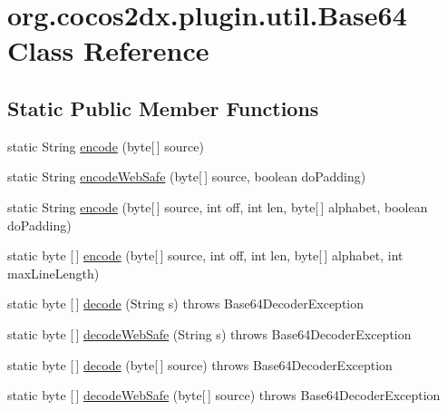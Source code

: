 \hypertarget{classorg_1_1cocos2dx_1_1plugin_1_1util_1_1Base64}{}\section{org.\+cocos2dx.\+plugin.\+util.\+Base64 Class Reference}
\label{classorg_1_1cocos2dx_1_1plugin_1_1util_1_1Base64}
\subsection*{Static Public Member Functions}
\begin{DoxyCompactItemize}
\item 
static String \hyperlink{classorg_1_1cocos2dx_1_1plugin_1_1util_1_1Base64_a4d965b06e97270e1f3989e73bdad171e}{encode} (byte\mbox{[}$\,$\mbox{]} source)
\item 
static String \hyperlink{classorg_1_1cocos2dx_1_1plugin_1_1util_1_1Base64_a4726c7d8d38436e17b5c49ec5d028132}{encode\+Web\+Safe} (byte\mbox{[}$\,$\mbox{]} source, boolean do\+Padding)
\item 
static String \hyperlink{classorg_1_1cocos2dx_1_1plugin_1_1util_1_1Base64_a70461ddf22199c83aeca320cec399187}{encode} (byte\mbox{[}$\,$\mbox{]} source, int off, int len, byte\mbox{[}$\,$\mbox{]} alphabet, boolean do\+Padding)
\item 
static byte \mbox{[}$\,$\mbox{]} \hyperlink{classorg_1_1cocos2dx_1_1plugin_1_1util_1_1Base64_aecdf0ebe1048a7dc60c3d0023a023489}{encode} (byte\mbox{[}$\,$\mbox{]} source, int off, int len, byte\mbox{[}$\,$\mbox{]} alphabet, int max\+Line\+Length)
\item 
static byte \mbox{[}$\,$\mbox{]} \hyperlink{classorg_1_1cocos2dx_1_1plugin_1_1util_1_1Base64_ad2bac3d895c8b36bb6141dd142c8e77e}{decode} (String s)  throws Base64\+Decoder\+Exception 
\item 
static byte \mbox{[}$\,$\mbox{]} \hyperlink{classorg_1_1cocos2dx_1_1plugin_1_1util_1_1Base64_a0df7e57a3859fb99da3a700402bb2155}{decode\+Web\+Safe} (String s)  throws Base64\+Decoder\+Exception 
\item 
static byte \mbox{[}$\,$\mbox{]} \hyperlink{classorg_1_1cocos2dx_1_1plugin_1_1util_1_1Base64_afc764d12c8b0ecf6cfcd9a7b34c44e29}{decode} (byte\mbox{[}$\,$\mbox{]} source)  throws Base64\+Decoder\+Exception 
\item 
static byte \mbox{[}$\,$\mbox{]} \hyperlink{classorg_1_1cocos2dx_1_1plugin_1_1util_1_1Base64_aaf8f202924a5e06f73ba1b111db69346}{decode\+Web\+Safe} (byte\mbox{[}$\,$\mbox{]} source)  throws Base64\+Decoder\+Exception 

\end{DoxyCompactItemize}
